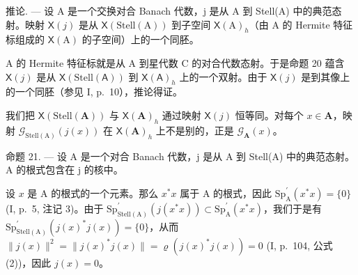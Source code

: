推论. --- 设 A 是一个交换对合 Banach 代数，j 是从 A 到 Stell(A) 中的典范态射。映射 \(\mathsf{X}(j)\) 是从 \(\mathsf{X}(\mathrm{Stell}(\mathrm{A}))\) 到子空间 \(\mathsf{X}(\mathrm{A})_{h}\)（由 A 的 Hermite 特征标组成的 \(\mathsf{X}(\mathrm{A})\) 的子空间）上的一个同胚。

A 的 Hermite 特征标就是从 A 到星代数 C 的对合代数态射。于是命题 20 蕴含 \(\mathsf{X}(j)\) 是从 \(\mathsf{X}(\mathrm{Stell}(\mathsf{A}))\) 到 \(\mathsf{X}(\mathsf{A})_h\) 上的一个双射。由于 \(\mathsf{X}(j)\) 是到其像上的一个同胚（参见 I, p.~10），推论得证。

我们把 \(\mathsf{X}(\mathrm{Stell}(\mathbf{A}))\) 与 \(\mathsf{X}(\mathbf{A})_h\) 通过映射 \(\mathsf{X}(j)\) 恒等同。对每个 \(x\in \mathbf{A}\)，映射 \(\mathcal{G}_{\mathrm{Stell(A)}}(j(x))\) 在 \(\mathsf{X}(\mathbf{A})_h\) 上不是别的，正是 \(\mathcal{G}_{\mathbf{A}}(x)\)。

命题 21. --- 设 A 是一个对合 Banach 代数，j 是从 A 到 Stell(A) 中的典范态射。A 的根式包含在 j 的核中。

设 \(x\) 是 A 的根式的一个元素。那么 \(x^{*}x\) 属于 A 的根式，因此 \(\mathrm{Sp}_{\mathrm{A}}^{\prime}(x^{*}x) = \{0\}\) (I, p.~5, 注记 3)。由于 \(\mathrm{Sp}_{\mathrm{Stell(A)}}^{\prime}(j(x^{*}x)) \subset \mathrm{Sp}_{\mathrm{A}}^{\prime}(x^{*}x)\)，我们于是有 \(\mathrm{Sp}_{\mathrm{Stell(A)}}^{\prime}(j(x)^{*}j(x)) = \{0\}\)，从而 \(\| j(x)\| ^2 = \| j(x)^{*}j(x)\| = \varrho (j(x)^{*}j(x)) = 0\) (I, p.~104, 公式 (2))，因此 \(j(x) = 0\)。
\relax{}
